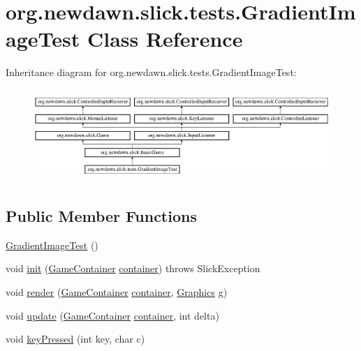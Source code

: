 \hypertarget{classorg_1_1newdawn_1_1slick_1_1tests_1_1_gradient_image_test}{}\section{org.\+newdawn.\+slick.\+tests.\+Gradient\+Image\+Test Class Reference}
\label{classorg_1_1newdawn_1_1slick_1_1tests_1_1_gradient_image_test}
Inheritance diagram for org.\+newdawn.\+slick.\+tests.\+Gradient\+Image\+Test\+:\begin{figure}[H]
\begin{center}
\leavevmode
\includegraphics[height=3.522012cm]{classorg_1_1newdawn_1_1slick_1_1tests_1_1_gradient_image_test}
\end{center}
\end{figure}
\subsection*{Public Member Functions}
\begin{DoxyCompactItemize}
\item 
\mbox{\hyperlink{classorg_1_1newdawn_1_1slick_1_1tests_1_1_gradient_image_test_a325c7f08ba6dc2863679a6e155e5c23e}{Gradient\+Image\+Test}} ()
\item 
void \mbox{\hyperlink{classorg_1_1newdawn_1_1slick_1_1tests_1_1_gradient_image_test_a7f3c06f7854bbbb5c682a7b282c5806c}{init}} (\mbox{\hyperlink{classorg_1_1newdawn_1_1slick_1_1_game_container}{Game\+Container}} \mbox{\hyperlink{classorg_1_1newdawn_1_1slick_1_1tests_1_1_gradient_image_test_a33951eefaea77bf372778299a807d06a}{container}})  throws Slick\+Exception 
\item 
void \mbox{\hyperlink{classorg_1_1newdawn_1_1slick_1_1tests_1_1_gradient_image_test_afa6acbf0a880f9f32a4e10c0b30912e2}{render}} (\mbox{\hyperlink{classorg_1_1newdawn_1_1slick_1_1_game_container}{Game\+Container}} \mbox{\hyperlink{classorg_1_1newdawn_1_1slick_1_1tests_1_1_gradient_image_test_a33951eefaea77bf372778299a807d06a}{container}}, \mbox{\hyperlink{classorg_1_1newdawn_1_1slick_1_1_graphics}{Graphics}} g)
\item 
void \mbox{\hyperlink{classorg_1_1newdawn_1_1slick_1_1tests_1_1_gradient_image_test_a73a441115b261f313befad61c698da54}{update}} (\mbox{\hyperlink{classorg_1_1newdawn_1_1slick_1_1_game_container}{Game\+Container}} \mbox{\hyperlink{classorg_1_1newdawn_1_1slick_1_1tests_1_1_gradient_image_test_a33951eefaea77bf372778299a807d06a}{container}}, int delta)
\item 
void \mbox{\hyperlink{classorg_1_1newdawn_1_1slick_1_1tests_1_1_gradient_image_test_a1d578d84408c38e04a1cae5dbf922c04}{key\+Pressed}} (int key, char c)
\end{DoxyCompactItemize}
